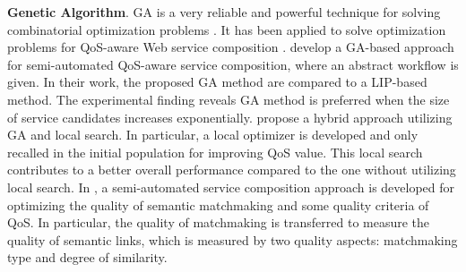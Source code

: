 \textbf{Genetic Algorithm}. 
GA is a very reliable and powerful technique for solving combinatorial optimization problems \cite{srinivas1994genetic}. It has been applied to solve optimization problems for QoS-aware Web service composition \cite{wang2012survey}. \cite{canfora2005approach} develop a GA-based approach for semi-automated QoS-aware service composition, where an abstract workflow is given. In their work, the proposed GA method are compared to a LIP-based method. The experimental finding reveals GA method is preferred when the size of service candidates increases exponentially. \cite{tang2010hybrid} propose a hybrid approach utilizing GA and local search. In particular, a local optimizer is developed and only recalled in the initial population for improving QoS value. This local search contributes to a better overall performance compared to the one without utilizing local search. In \cite{lecue2009optimizing}, a semi-automated service composition approach is developed for optimizing the quality of semantic matchmaking and some quality criteria of QoS. In particular, the quality of matchmaking is transferred to measure the quality of semantic links, which is measured by two quality aspects: matchmaking type and degree of similarity.

